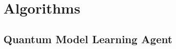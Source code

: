 
%         

%         
%         

\part{Algorithms}\label{part:algorithms}
    \chapter{Quantum Model Learning Agent}\label{chapter:qmla}
        
%         

